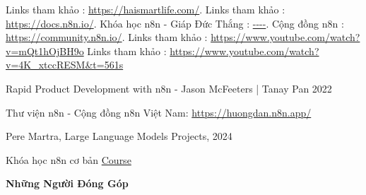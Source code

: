 \documentclass[a4paper,12pt,oneside]{book}
\begin{document}


\nopagecolor 

\begin{thebibliography}{99}

Links tham khảo :  \url{https://haismartlife.com/}.
Links tham khảo :  \url{https://docs.n8n.io/}.
Khóa học n8n - Giáp Đức Thắng :  \url{----}.
Cộng đồng n8n :  
\url{https://community.n8n.io/}.
Links tham khảo :  \url{https://www.youtube.com/watch?v=mQt1hOjBH9o}
Links tham khảo :  \url{https://www.youtube.com/watch?v=4K_xtccRESM&t=561s}


 Rapid Product Development with n8n - Jason McFeeters | Tanay Pan 2022

 Thư viện n8n - Cộng đồng n8n Việt Nam: \href{link}{https://huongdan.n8n.app/}

 Pere Martra, Large Language Models Projects, 2024

 Khóa học n8n cơ bản \href{https://www.youtube.com/playlist?list=PLlET0GsrLUL59YbxstZE71WszP3pVnZfI}{Course}

\end{thebibliography}

\begin{flushright}
\end{flushright}

\newpage
\begin{flushright}
\huge \textbf{Những Người Đóng Góp}
\end{flushright}
\end{document}
